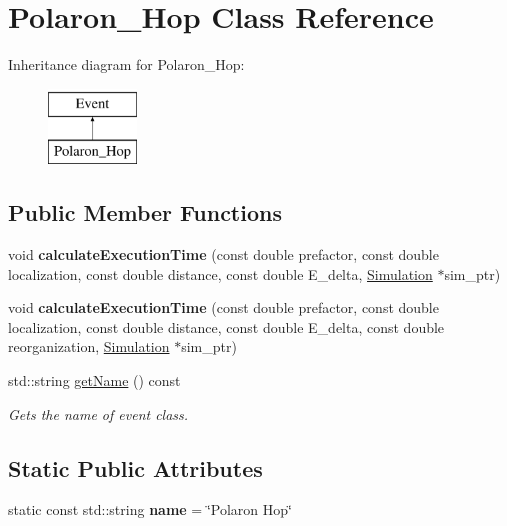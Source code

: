 \hypertarget{class_polaron___hop}{}\section{Polaron\+\_\+\+Hop Class Reference}
\label{class_polaron___hop}
Inheritance diagram for Polaron\+\_\+\+Hop\+:\begin{figure}[H]
\begin{center}
\leavevmode
\includegraphics[height=2.000000cm]{class_polaron___hop}
\end{center}
\end{figure}
\subsection*{Public Member Functions}
\begin{DoxyCompactItemize}
\item 
\mbox{\label{class_polaron___hop_a045872c8934bc0a93245f4fecb4396ed}} 
void {\bfseries calculate\+Execution\+Time} (const double prefactor, const double localization, const double distance, const double E\+\_\+delta, \hyperlink{class_simulation}{Simulation} $\ast$sim\+\_\+ptr)
\item 
\mbox{\label{class_polaron___hop_a338a825324a7901a8a6b3d1496c7741d}} 
void {\bfseries calculate\+Execution\+Time} (const double prefactor, const double localization, const double distance, const double E\+\_\+delta, const double reorganization, \hyperlink{class_simulation}{Simulation} $\ast$sim\+\_\+ptr)
\item 
std\+::string \hyperlink{class_polaron___hop_adbb1a3f86bd6a2dd21849bfec5598d70}{get\+Name} () const
\begin{DoxyCompactList}\small\item\em Gets the name of event class. \end{DoxyCompactList}\end{DoxyCompactItemize}
\subsection*{Static Public Attributes}
\begin{DoxyCompactItemize}
\item 
\mbox{\label{class_polaron___hop_abcfa4d47e99311d95dd2284bd67cc95a}} 
static const std\+::string {\bfseries name} = \char`\"{}Polaron Hop\char`\"{}
\end{DoxyCompactItemize}



